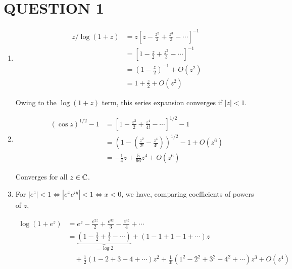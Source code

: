 \documentclass[a4paper]{article}
\begin{document}
	
\maketitle

\section{QUESTION 1}


\begin{enumerate}
	\item \begin{align*}
	z/\log(1+z)& = z \left[  z - \frac{z^{2}}{2} + \frac{z^{3}}{3} - \cdots     \right]^{-1}  \\
	& = \left[  1 - \frac{z}{2} + \frac{z^{2}}{3} - \cdots     \right]^{-1} \\
	& = \left(  1 - \frac{z}{2} \right)^{-1} + O(z^{2}) \\
	& = 1 + \frac{z}{2} + O(z^{2}) 
	\end{align*}
	
	
	Owing to the $ \log(1+z) $ term, this series expansion converges if $ | z | < 1 $. 
	
	
	\item \begin{align*}
	(\cos z)^{1/2} -1 & = \left[   1 - \frac{z^{2}}{2} +  \frac{z^{4}}{4!} - \cdots  \right]^{1/2} - 1  \\
	& = \left(  1 - \left(  \frac{z^{2}}{2!} - \frac{z^{4}}{4!}  \right)  \right)^{1/2} - 1 + O(z^{6}) \\
	& = - \frac{1}{4} z + \frac{5}{96} z^{4} + O(z^{6}) 
	\end{align*}
	
	Converges for all $ z \in \mathbb{C} $.
	
	\item For $ | e^{z}  | < 1 \iff | e^{x} e^{iy} | < 1 \iff x < 0 $, we have, comparing coefficients of powers of $ z $, 
	
	\begin{align*} \log(1+e^{z})  & = e^{z} - \frac{e^{2z}}{2} + \frac{e^{3z}}{3} - \frac{e^{4z}}{4} + \cdots   \\
	& = \underbrace{\left(  1 - \frac{1}{2} + \frac{1}{3} - \cdots \right)}_{= \log 2} + \left( 1 - 1 + 1 - 1 + \cdots \right) z  \\
	& \quad + \frac{1}{2}\left( 1 - 2 + 3 - 4 + \cdots   \right) z^{2} + \frac{1}{3!} \left( 1^{2} - 2^{2} + 3^{2} - 4^{2} +  \cdots   \right) z^{3} +  O(z^{4}) 
	\end{align*}
	

\end{enumerate}
\end{document}
